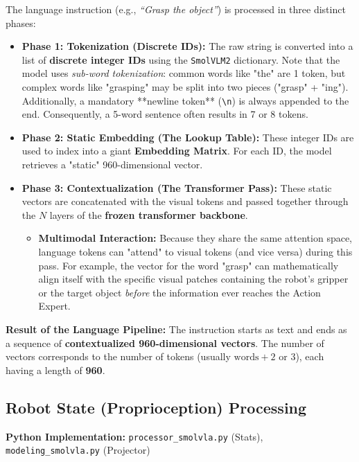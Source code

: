 \documentclass[11pt,a4paper]{article}
\begin{document}
The language instruction (e.g., \textit{``Grasp the object''}) is processed in three distinct phases:
\begin{itemize}
    \item \textbf{Phase 1: Tokenization (Discrete IDs):} The raw string is converted into a list of \textbf{discrete integer IDs} using the \texttt{SmolVLM2} dictionary. Note that the model uses \textit{sub-word tokenization}: common words like "the" are 1 token, but complex words like "grasping" may be split into two pieces ("grasp" + "ing"). Additionally, a mandatory **newline token** (\verb|\n|) is always appended to the end. Consequently, a 5-word sentence often results in 7 or 8 tokens.
    \item \textbf{Phase 2: Static Embedding (The Lookup Table):} These integer IDs are used to index into a giant \textbf{Embedding Matrix}. For each ID, the model retrieves a "static" 960-dimensional vector.
    \item \textbf{Phase 3: Contextualization (The Transformer Pass):} These static vectors are concatenated with the visual tokens and passed together through the $N$ layers of the \textbf{frozen transformer backbone}. 
    \begin{itemize}
        \item \textbf{Multimodal Interaction:} Because they share the same attention space, language tokens can "attend" to visual tokens (and vice versa) during this pass. For example, the vector for the word "grasp" can mathematically align itself with the specific visual patches containing the robot's gripper or the target object \textit{before} the information ever reaches the Action Expert.
    \end{itemize}
\end{itemize}

\textbf{Result of the Language Pipeline:} The instruction starts as text and ends as a sequence of \textbf{contextualized 960-dimensional vectors}. The number of vectors corresponds to the number of tokens (usually $\text{words} + 2 \text{ or } 3$), each having a length of \textbf{960}.

\subsection{Robot State (Proprioception) Processing}
\textbf{Python Implementation:} \texttt{processor\_smolvla.py} (Stats), \texttt{modeling\_smolvla.py} (Projector)
\end{document}

